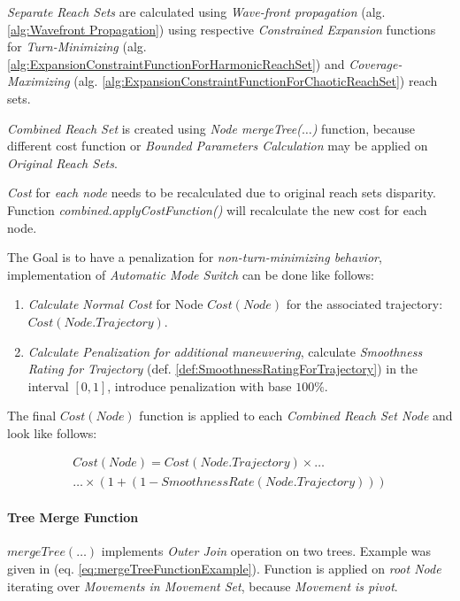 \emph{Separate Reach Sets} are calculated using \emph{Wave-front propagation} (alg. \ref{alg:Wavefront Propagation}) using respective \emph{Constrained Expansion} functions for \emph{Turn-Minimizing} (alg. \ref{alg:ExpansionConstraintFunctionForHarmonicReachSet}) and \emph{Coverage-Maximizing} (alg. \ref{alg:ExpansionConstraintFunctionForChaoticReachSet}) reach sets.

\emph{Combined Reach Set} is created using \emph{Node mergeTree($\dots$)} function, because different cost function or \emph{Bounded Parameters Calculation} may be applied on \emph{Original Reach Sets}.

\emph{Cost} for \emph{each node} needs to be recalculated due to original reach sets disparity. Function \emph{combined.applyCostFunction()} will recalculate the new cost for each node. 

The Goal is to have a penalization for \emph{non-turn-minimizing behavior}, implementation of \emph{Automatic Mode Switch} can be done like follows:
\begin{enumerate}
    \item \emph{Calculate Normal Cost} for Node $Cost(Node)$ for the associated trajectory:\\ $Cost(Node.Trajectory)$.
    
    \item \emph{Calculate Penalization for \emph{additional maneuvering}}, calculate \emph{Smoothness Rating for Trajectory} (def. \ref{def:SmoothnessRatingForTrajectory}) in the interval $[0,1]$, introduce penalization with base $100 \%$.
\end{enumerate}

\noindent The final $Cost(Node)$ function is applied to each \emph{Combined Reach Set Node} and look like follows:

\begin{multline}
    Cost(Node) = Cost(Node.Trajectory) \times\dots\\\dots\times \left(1+ \left(1-SmoothnessRate(N ode.T rajectory)\right)\right)
\end{multline}


\paragraph{Tree Merge Function} $mergeTree(\dots)$ implements \emph{Outer Join} operation on two trees. Example was given in (eq. \ref{eq:mergeTreeFunctionExample}).
Function is applied on \emph{root Node} iterating over \emph{Movements in Movement Set}, because \emph{Movement is pivot}.


